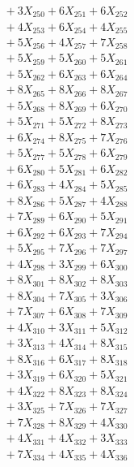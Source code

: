 \documentclass[a4paper,10pt]{article}
\begin{document}
{\begin{align}
&\;  + 3 X_{250} + 6 X_{251} + 6 X_{252} \\[0.3ex]
&\;  + 4 X_{253} + 6 X_{254} + 4 X_{255} \\[0.3ex]
&\;  + 5 X_{256} + 4 X_{257} + 7 X_{258} \\[0.3ex]
&\;  + 5 X_{259} + 5 X_{260} + 5 X_{261} \\[0.3ex]
&\;  + 5 X_{262} + 6 X_{263} + 6 X_{264} \\[0.3ex]
&\;  + 8 X_{265} + 8 X_{266} + 8 X_{267} \\[0.3ex]
&\;  + 5 X_{268} + 8 X_{269} + 6 X_{270} \\[0.3ex]
&\;  + 5 X_{271} + 5 X_{272} + 8 X_{273} \\[0.3ex]
&\;  + 6 X_{274} + 8 X_{275} + 7 X_{276} \\[0.3ex]
&\;  + 5 X_{277} + 5 X_{278} + 6 X_{279} \\[0.5ex]\allowbreak
&\;  + 6 X_{280} + 5 X_{281} + 6 X_{282} \\[0.3ex]
&\;  + 6 X_{283} + 4 X_{284} + 5 X_{285} \\[0.3ex]
&\;  + 8 X_{286} + 5 X_{287} + 4 X_{288} \\[0.3ex]
&\;  + 7 X_{289} + 6 X_{290} + 5 X_{291} \\[0.3ex]
&\;  + 6 X_{292} + 6 X_{293} + 7 X_{294} \\[0.3ex]
&\;  + 5 X_{295} + 7 X_{296} + 7 X_{297} \\[0.3ex]
&\;  + 4 X_{298} + 3 X_{299} + 6 X_{300} \\[0.3ex]
&\;  + 8 X_{301} + 8 X_{302} + 8 X_{303} \\[0.3ex]
&\;  + 8 X_{304} + 7 X_{305} + 3 X_{306} \\[0.3ex]
&\;  + 7 X_{307} + 6 X_{308} + 7 X_{309} \\[0.5ex]\allowbreak
&\;  + 4 X_{310} + 3 X_{311} + 5 X_{312} \\[0.3ex]
&\;  + 3 X_{313} + 4 X_{314} + 8 X_{315} \\[0.3ex]
&\;  + 8 X_{316} + 6 X_{317} + 8 X_{318} \\[0.3ex]
&\;  + 3 X_{319} + 6 X_{320} + 5 X_{321} \\[0.3ex]
&\;  + 4 X_{322} + 8 X_{323} + 8 X_{324} \\[0.3ex]
&\;  + 3 X_{325} + 7 X_{326} + 7 X_{327} \\[0.3ex]
&\;  + 7 X_{328} + 8 X_{329} + 4 X_{330} \\[0.3ex]
&\;  + 4 X_{331} + 4 X_{332} + 3 X_{333} \\[0.3ex]
&\;  + 7 X_{334} + 4 X_{335} + 4 X_{336} \\[0.3ex]

\end{align}}
\end{document}
